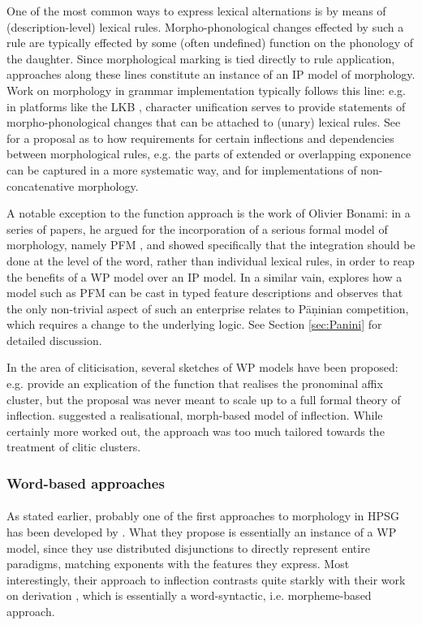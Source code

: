 \documentclass[output=paper
                ,modfonts
                ,nonflat
	        ,collection
	        ,collectionchapter
	        ,collectiontoclongg
 	        ,biblatex
                ,babelshorthands
                ,newtxmath
                ,draftmode
                ,colorlinks, citecolor=brown
] {langscibook}
\begin{document}
{One of the most common ways to express lexical alternations is by
means of (description-level) lexical rules. Morpho-phonological changes
effected by such a rule are typically effected by some (often
undefined) function on the phonology of the daughter. Since
morphological marking is tied directly to rule application, approaches
along these lines constitute an instance of an IP model of
morphology. Work on morphology in grammar implementation typically
follows this line: e.g. in platforms like the LKB \citep{Copestake02},
character unification serves to provide statements of
morpho-phonological changes that can be attached to (unary) lexical
rules. See \citet{Goodman10} for a proposal as to how requirements for
certain inflections and dependencies
between morphological rules, e.g. the parts of extended or overlapping
exponence can be captured in a more systematic way,
and \citet{Crysmann:15:JLM,Crysmann:2017:JOMO} for implementations of
non-concatenative morphology. 


A notable exception to the function approach is the work of Olivier
Bonami: in a series of papers, he argued for the incorporation of a
serious formal model of morphology, namely PFM \citep{Stump01}, and
showed specifically that the integration should be done at the level
of the word, rather than individual lexical rules, in order to reap
the benefits of a WP model over an IP model.  In a similar vain,
\citet{Erjavec94} explores how a model such as PFM can be cast in
typed feature descriptions and observes that the only non-trivial
aspect of such an enterprise relates to Pāṇinian competition, which
requires a change to the underlying logic. See Section
\ref{sec:Panini} for detailed discussion.

In the area of cliticisation, several sketches of WP models have been
proposed: e.g. \citet{Miller97} provide an explication of the function
that realises the pronominal affix cluster, but the proposal was never
meant to scale up to a full formal theory of
inflection. \citet{crysmann_b03book} suggested a realisational,
morph-based model of inflection. While certainly more worked out, the
approach was too much tailored towards the treatment of clitic
clusters. 



\subsubsection{Word-based approaches}

\paragraph*{\citet{Krieger:Nerbonne:93}}
As stated earlier, probably one of the first approaches to morphology
in HPSG has been developed by \citet{Krieger:Nerbonne:93}. What they
propose is essentially an instance of a WP model, since they use
distributed disjunctions to directly represent entire paradigms,
matching exponents with the features they express. Most interestingly,
their approach to inflection contrasts quite starkly with their
work on derivation \citep{Krieger:Nerbonne:93}, which is essentially a
word-syntactic, i.e. morpheme-based approach.


}
\end{document}
